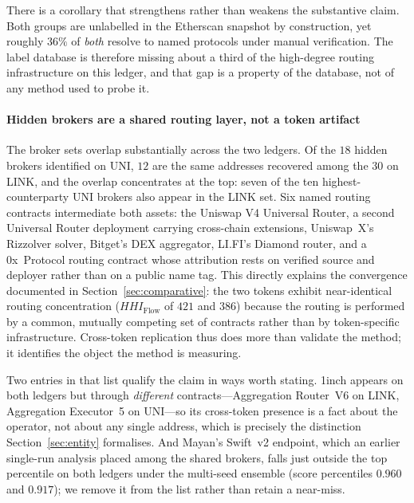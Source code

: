\documentclass[final,5p,times]{elsarticle}
\begin{document}
There is a corollary that strengthens rather than weakens the substantive
claim. Both groups are unlabelled in the Etherscan snapshot by construction,
yet roughly $36\%$ of \emph{both} resolve to named protocols under manual
verification. The label database is therefore missing about a third of the
high-degree routing infrastructure on this ledger, and that gap is a
property of the database, not of any method used to probe it.

\paragraph{Hidden brokers are a shared routing layer, not a token
artifact}
The broker sets overlap substantially across the two ledgers. Of the $18$
hidden brokers identified on UNI, $12$ are the same addresses recovered
among the $30$ on LINK, and the overlap concentrates at the top: seven of
the ten highest-counterparty UNI brokers also appear in the LINK set. Six
named routing contracts intermediate both assets: the Uniswap V4 Universal
Router, a second Universal Router deployment carrying cross-chain
extensions, Uniswap~X's Rizzolver solver, Bitget's DEX aggregator, LI.FI's
Diamond router, and a 0x~Protocol routing contract whose attribution rests
on verified source and deployer rather than on a public name tag. This
directly explains
the convergence documented in Section~\ref{sec:comparative}: the two tokens
exhibit near-identical routing concentration ($HHI_{\text{Flow}}$ of $421$
and $386$) because the routing is performed by a common, mutually competing
set of contracts rather than by token-specific infrastructure. Cross-token
replication thus does more than validate the method; it identifies the
object the method is measuring.




Two entries in that list qualify the claim in ways worth stating. 1inch
appears on both ledgers but through \emph{different} contracts---Aggregation
Router~V6 on LINK, Aggregation Executor~5 on UNI---so its cross-token
presence is a fact about the operator, not about any single address, which
is precisely the distinction Section~\ref{sec:entity} formalises. And Mayan's
Swift~v2 endpoint, which an earlier single-run analysis placed among the
shared brokers, falls just outside the top percentile on both ledgers under
the multi-seed ensemble (score percentiles $0.960$ and $0.917$); we remove
it from the list rather than retain a near-miss.
\end{document}
